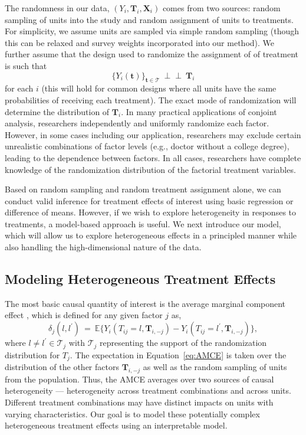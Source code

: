 \documentclass[11pt]{article}
\newcommand{\ind}{\mbox{$\perp\!\!\!\perp$}}
\newcommand\E{\mathbb{E}}
\newcommand\cT{\mathcal{T}}
\newcommand\bT{\bm{T}}
\newcommand\bt{\bm{t}}
\newcommand\bX{\bm{X}}
\begin{document}
The randomness in our data, $(Y_i, \bT_i, \bX_i)$ comes from two sources: random sampling of units into the study and random assignment of units to treatments.
For simplicity, we assume units are sampled via simple random sampling (though this can be relaxed and survey weights incorporated into our method).
We further assume that the design used to randomize the assignment of of treatment is such that
\begin{equation*}
  \{Y_i(\bt)\}_{\bt \in \cT} \ \ind \  \bT_i
\end{equation*}
for each $i$ (this will hold for common designs where all units have the same probabilities of receiving each treatment).
The exact mode of randomization will determine the distribution of $\bT_i$.
In many practical applications of conjoint analysis,
researchers independently and uniformly randomize each factor.
However, in some cases including our application, researchers may
exclude certain unrealistic combinations of factor levels (e.g.,
doctor without a college degree), leading to the dependence between
factors.  In all cases, researchers have complete knowledge of the
randomization distribution of the factorial treatment variables.

Based on random sampling and random treatment assignment alone, we can conduct valid inference for treatment effects of interest using basic regression or difference of means.
However, if we wish to explore heterogeneity in responses to treatments, a model-based approach is useful.
We next introduce our model, which will allow us to explore heterogeneous effects in a principled manner while also handling the high-dimensional nature of the data.


\subsection{Modeling Heterogeneous Treatment Effects}

The most basic causal quantity of interest is the average marginal
component effect \citep[AMCE;][]{hainmueller2014causal}, which is
defined for any given factor $j$ as,
\begin{equation}
  \delta_j (l, l^\prime) \ = \ \E\{Y_i(T_{ij}=l, \bT_{i,-j}) - Y_i(T_{ij}
  = l^\prime, \bT_{i,-j})\}, \label{eq:AMCE}
\end{equation}
where $l \ne l^\prime \in \cT_j$ with $\cT_j$ representing the support
of the randomization distribution for $T_j$.  The expectation in
Equation~\eqref{eq:AMCE} is taken over the distribution of the other
factors $\bT_{i,-j}$ as well as the random sampling of units from the
population.  Thus, the AMCE averages over two sources of causal
heterogeneity --- heterogeneity across treatment combinations and
across units.  Different treatment combinations may have distinct
impacts on units with varying characteristics.  Our goal is to model
these potentially complex heterogeneous treatment effects using an
interpretable model.
\end{document}
